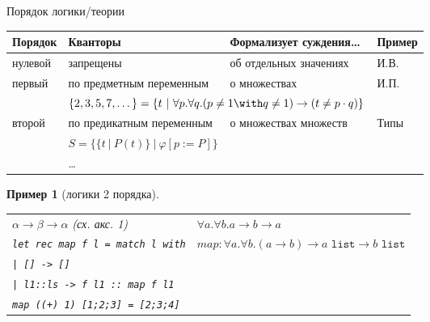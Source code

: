 \documentclass[handout]{beamer}
\newtheorem{exm}{Пример}[section]
\begin{document}
\begin{frame}{Порядок логики/теории}
\begin{tabular}{llll}
Порядок & Кванторы & Формализует суждения\dots & Пример\\\hline
нулевой & запрещены & об отдельных значениях & И.В.\\
первый & по предметным переменным & о множествах & И.П.\\
    &   \multicolumn{2}{l}{\color{olive}$\{2,3,5,7,\dots\} = \{ t\ |\ \forall p.\forall q.(p \ne 1 \with q \ne 1) \rightarrow (t \ne p\cdot q)\}$}\\
второй & по предикатным переменным & о множествах множеств & Типы\\
    &   \multicolumn{2}{l}{\color{olive}$S = \{ \{t\ |\ P(t)\}\ |\ \varphi[p := P] \}$}\\
 & \dots 
\end{tabular}
\pause\vspace{0.3cm}

\begin{exm}[логики 2 порядка]\upshape
\begin{tabular}{ll}
$\alpha\rightarrow\beta\rightarrow\alpha$ (сх. акс. 1) & $\forall a.\forall b.a \rightarrow b \rightarrow a$ \vspace{0.1cm}\\
\texttt{let rec map f l = match l with} & $map: \forall a.\forall b.(a \rightarrow b) \rightarrow a\texttt{ list} \rightarrow b\texttt{ list}$ \\
\texttt{| [] -> []} \\
\texttt{| l1::ls -> f l1 :: map f l1}\vspace{0.1cm}\\
\texttt{map ((+) 1) [1;2;3] = [2;3;4]}
\end{tabular}
\end{exm}

\end{frame}
\end{document}
